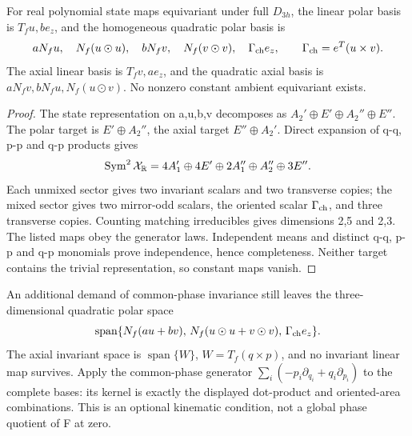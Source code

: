 \begin{theorem}\label{thm:observables}
For real polynomial state maps equivariant under full \(D_{3h}\), the linear polar basis is \(T_fu,be_z\), and the homogeneous quadratic polar basis is
\begin{equation}
aN_fu,\quad N_f(u\odot u),\quad bN_fv,\quad
N_f(v\odot v),\quad\Gamma_{\rm ch}e_z,\qquad
\Gamma_{\rm ch}=e^T(u\times v).\label{eq:polarbasis}
\end{equation}
The axial linear basis is \(T_fv,ae_z\), and the quadratic axial basis is
\(aN_fv,bN_fu,N_f(u\odot v)\). No nonzero constant ambient equivariant exists.
\end{theorem}
\begin{proof}
The state representation on a,u,b,v decomposes as \(A_2'\oplus E'\oplus A_2''\oplus E''\). The polar target is \(E'\oplus A_2''\), the axial target \(E''\oplus A_2'\). Direct expansion of q-q, p-p and q-p products gives
\begin{equation}
\operatorname{Sym}^2\mathcal X_\mathbb R=
4A_1'\oplus4E'\oplus2A_1''\oplus A_2''\oplus3E''.\label{eq:sym2}
\end{equation}
Each unmixed sector gives two invariant scalars and two transverse copies; the mixed sector gives two mirror-odd scalars, the oriented scalar \(\Gamma_{\rm ch}\), and three transverse copies. Counting matching irreducibles gives dimensions 2,5 and 2,3. The listed maps obey the generator laws. Independent means and distinct q-q, p-p and q-p monomials prove independence, hence completeness. Neither target contains the trivial representation, so constant maps vanish.
\end{proof}

An additional demand of common-phase invariance still leaves the three-dimensional quadratic polar space
\begin{equation}
\operatorname{span}\{N_f(au+bv),\,N_f(u\odot u+v\odot v),\,
\Gamma_{\rm ch}e_z\}.\label{eq:U1}
\end{equation}
The axial invariant space is \(\operatorname{span}\{W\}\), \(W=T_f(q\times p)\), and no invariant linear map survives. Apply the common-phase generator
\(\sum_i(-p_i\partial_{q_i}+q_i\partial_{p_i})\) to the complete bases: its kernel is exactly the displayed dot-product and oriented-area combinations. This is an optional kinematic condition, not a global phase quotient of F at zero.


